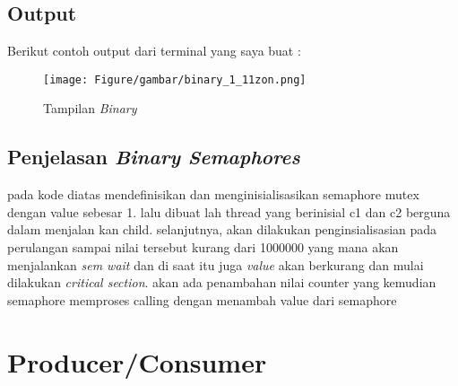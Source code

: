 \documentclass[11pt,a4paper]{article}
\begin{document}
\subsection{\textbf{Output}}
    Berikut contoh output dari terminal yang saya buat :
    
    \begin{figure}[h]
        \centering
        \texttt{[image: Figure/gambar/binary\_1\_11zon.png]}
        \caption{Tampilan \textit{Binary}}
        \label{fig:tut2_1}
    \end{figure}
    
\subsection{Penjelasan \textit{Binary Semaphores}}
    pada kode diatas mendefinisikan dan menginisialisasikan semaphore mutex dengan value sebesar 1. lalu dibuat lah thread yang berinisial c1 dan c2 berguna dalam menjalan kan child. selanjutnya, akan dilakukan penginsialisasian pada perulangan sampai nilai tersebut kurang dari 1000000 yang mana akan menjalankan \textit{sem wait} dan di saat itu juga \textit{value} akan berkurang dan mulai dilakukan \textit{critical section}. akan ada penambahan nilai counter yang kemudian semaphore memproses calling dengan menambah value dari semaphore
    
\section{\textbf{Producer/Consumer}}
\end{document}
